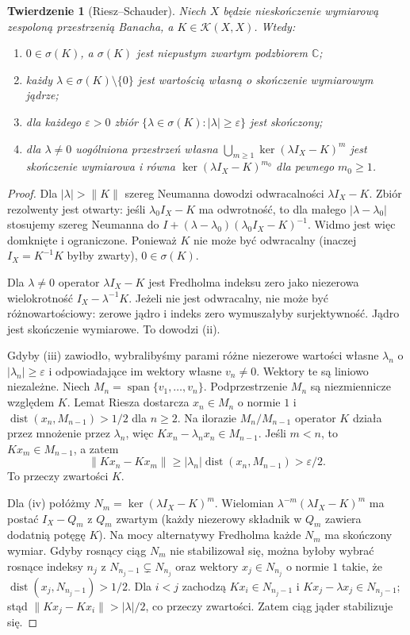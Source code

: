\documentclass[11pt,a4paper]{article}
\numberwithin{equation}{section}
\theoremstyle{plain}
\newtheorem{twierdzenie}{Twierdzenie}[section]
\theoremstyle{definition}
\theoremstyle{remark}
\newcommand{\C}{\mathbb C}
\begin{document}
\begin{twierdzenie}[Riesz--Schauder]
\label{thm:riesz-schauder30}
Niech $X$ będzie nieskończenie wymiarową zespoloną
przestrzenią Banacha, a $K\in\mathcal K(X,X)$.
Wtedy:
\begin{enumerate}[label=\textup{(\roman*)}]
\item $0\in\sigma(K)$, a $\sigma(K)$ jest niepustym
zwartym podzbiorem $\C$;
\item każdy $\lambda\in\sigma(K)\setminus\{0\}$ jest
wartością własną o skończenie wymiarowym jądrze;
\item dla każdego $\varepsilon>0$ zbiór
$\{\lambda\in\sigma(K):|\lambda|\ge\varepsilon\}$
jest skończony;
\item dla $\lambda\ne0$ uogólniona przestrzeń własna
$\bigcup_{m\ge1}\ker(\lambda I_X-K)^m$ jest
skończenie wymiarowa i równa
$\ker(\lambda I_X-K)^{m_0}$ dla pewnego $m_0\ge1$.
\end{enumerate}
\end{twierdzenie}
\begin{proof}
Dla $|\lambda|>\|K\|$ szereg Neumanna dowodzi
odwracalności $\lambda I_X-K$. Zbiór rezolwenty jest otwarty:
jeśli $\lambda_0 I_X-K$ ma odwrotność, to dla małego
$|\lambda-\lambda_0|$ stosujemy szereg Neumanna do
$I+(\lambda-\lambda_0)(\lambda_0 I_X-K)^{-1}$.
Widmo jest więc domknięte i ograniczone. Ponieważ
$K$ nie może być odwracalny (inaczej
$I_X=K^{-1}K$ byłby zwarty), $0\in\sigma(K)$.

Dla $\lambda\ne0$ operator $\lambda I_X-K$ jest Fredholma
indeksu zero jako niezerowa wielokrotność $I_X-\lambda^{-1}K$.
Jeżeli nie jest odwracalny, nie może być różnowartościowy:
zerowe jądro i indeks zero wymuszałyby surjektywność.
Jądro jest skończenie wymiarowe. To dowodzi (ii).

Gdyby (iii) zawiodło, wybralibyśmy parami różne
niezerowe wartości własne $\lambda_n$ o
$|\lambda_n|\ge\varepsilon$ i odpowiadające im wektory
własne $v_n\ne0$. Wektory te są liniowo niezależne.
Niech $M_n=\operatorname{span}\{v_1,\ldots,v_n\}$.
Podprzestrzenie $M_n$ są niezmiennicze względem $K$.
Lemat Riesza dostarcza $x_n\in M_n$ o normie $1$ i
$\operatorname{dist}(x_n,M_{n-1})>1/2$ dla $n\ge2$.
Na ilorazie $M_n/M_{n-1}$ operator $K$ działa przez
mnożenie przez $\lambda_n$, więc
$Kx_n-\lambda_nx_n\in M_{n-1}$. Jeśli $m<n$,
to $Kx_m\in M_{n-1}$, a zatem
\[\|Kx_n-Kx_m\|\ge
|\lambda_n|\operatorname{dist}(x_n,M_{n-1})>\varepsilon/2.\]
To przeczy zwartości $K$.

Dla (iv) połóżmy $N_m=\ker(\lambda I_X-K)^m$.
Wielomian $\lambda^{-m}(\lambda I_X-K)^m$ ma postać
$I_X-Q_m$ z $Q_m$ zwartym (każdy niezerowy składnik
w $Q_m$ zawiera dodatnią potęgę $K$). Na mocy
alternatywy Fredholma każde $N_m$ ma skończony wymiar.
Gdyby rosnący ciąg $N_m$ nie stabilizował się, można
byłoby wybrać rosnące indeksy $n_j$ z
$N_{n_j-1}\subsetneq N_{n_j}$ oraz wektory
$x_j\in N_{n_j}$ o normie $1$ takie, że
$\operatorname{dist}(x_j,N_{n_j-1})>1/2$.
Dla $i<j$ zachodzą $Kx_i\in N_{n_j-1}$ i
$Kx_j-\lambda x_j\in N_{n_j-1}$; stąd
$\|Kx_j-Kx_i\|>|\lambda|/2$, co przeczy zwartości.
Zatem ciąg jąder stabilizuje się.
\end{proof}
\end{document}
